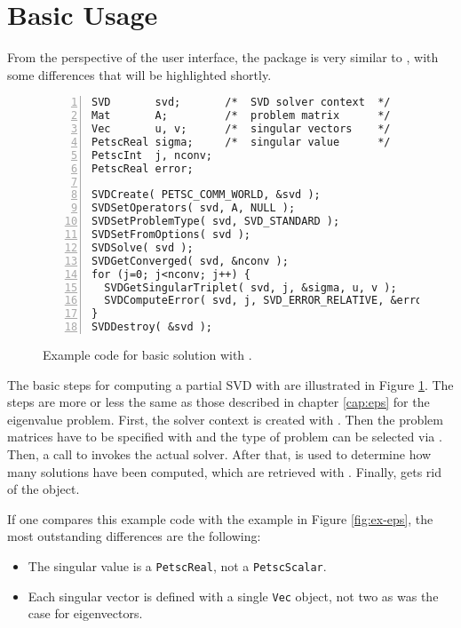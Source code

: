 \section{Basic Usage}

From the perspective of the user interface, the  package is very similar to , with some differences that will be highlighted shortly.

\begin{figure}
\begin{Verbatim}[fontsize=\small,numbers=left,numbersep=6pt,xleftmargin=15mm]
SVD       svd;       /*  SVD solver context  */
Mat       A;         /*  problem matrix      */
Vec       u, v;      /*  singular vectors    */
PetscReal sigma;     /*  singular value      */
PetscInt  j, nconv;
PetscReal error;

SVDCreate( PETSC_COMM_WORLD, &svd );
SVDSetOperators( svd, A, NULL );
SVDSetProblemType( svd, SVD_STANDARD );
SVDSetFromOptions( svd );
SVDSolve( svd );
SVDGetConverged( svd, &nconv );
for (j=0; j<nconv; j++) {
  SVDGetSingularTriplet( svd, j, &sigma, u, v );
  SVDComputeError( svd, j, SVD_ERROR_RELATIVE, &error );
}
SVDDestroy( &svd );
\end{Verbatim}
\caption{\label{fig:ex-svd}Example code for basic solution with .}
\end{figure}

The basic steps for computing a partial SVD with \slepc are illustrated in Figure \ref{fig:ex-svd}. The steps are more or less the same as those described in chapter \ref{cap:eps} for the eigenvalue problem. First, the solver context is created with . Then the problem matrices have to be specified with  and the type of problem can be selected via . Then, a call to  invokes the actual solver. After that,  is used to determine how many solutions have been computed, which are retrieved with . Finally,  gets rid of the object.

If one compares this example code with the  example in Figure \ref{fig:ex-eps}, the most outstanding differences are the following:
\begin{itemize}
\item The singular value is a \texttt{PetscReal}, not a \texttt{PetscScalar}.
\item Each singular vector is defined with a single \texttt{Vec} object, not two as was the case for eigenvectors.
\end{itemize}


